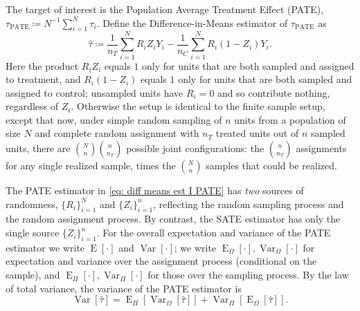 \documentclass[12pt,leqno]{article}
\theoremstyle{newstyle}
\DeclareMathOperator{\E}{\mathrm{E}}
\DeclareMathOperator{\Var}{\mathrm{Var}}
\newcommand{\EZ}{\E_{\Omega}}    \newcommand{\VarZ}{\Var_{\Omega}}  %
\newcommand{\ER}{\E_{\Pi}}       \newcommand{\VarR}{\Var_{\Pi}}     %
\newcommand{\tauP}{\tau_{\text{PATE}}}
\newcommand{\tauhat}{\hat{\tau}}
\begin{document}
The target of interest is the Population Average Treatment Effect (PATE), $\tauP \coloneqq N^{-1} \sum_{i = 1}^N \tau_i$. Define the Difference-in-Means estimator of $\tauP$ as
\begin{equation}
\label{eq: diff means est I PATE}
\tauhat \coloneqq \dfrac{1}{n_T} \sum \limits_{i = 1}^N R_i Z_i Y_i - \dfrac{1}{n_C} \sum \limits_{i = 1}^N R_i \left(1 - Z_i\right) Y_i.
\end{equation}
Here the product $R_i Z_i$ equals $1$ only for units that are both sampled and assigned to treatment, and $R_i(1 - Z_i)$ equals $1$ only for units that are both sampled and assigned to control; unsampled units have $R_i = 0$ and so contribute nothing, regardless of $Z_i$. Otherwise the setup is identical to the finite sample setup, except that now, under simple random sampling of $n$ units from a population of size $N$ and complete random assignment with $n_T$ treated units out of $n$ sampled units, there are $\binom{N}{n} \binom{n}{n_T}$ possible joint configurations: the $\binom{n}{n_T}$ assignments for any single realized sample, times the $\binom{N}{n}$ samples that could be realized.

The PATE estimator in \eqref{eq: diff means est I PATE} has \textit{two} sources of randomness, $\{R_i\}_{i = 1}^N$ and $\{Z_i\}_{i = 1}^n$, reflecting the random sampling process and the random assignment process. By contrast, the SATE estimator has only the single source $\{Z_i\}_{i = 1}^n$. For the overall expectation and variance of the PATE estimator we write $\E[\cdot]$ and $\Var[\cdot]$; we write $\EZ[\cdot], \VarZ[\cdot]$ for expectation and variance over the assignment process (conditional on the sample), and $\ER[\cdot], \VarR[\cdot]$ for those over the sampling process. By the law of total variance, the variance of the PATE estimator is
\begin{equation}
\label{eq: var diff means est PATE total var}
\Var\left[\tauhat\right] = \ER\left[\VarZ\left[\tauhat\right]\right] + \VarR\left[\EZ\left[\tauhat\right]\right].
\end{equation}
\end{document}
